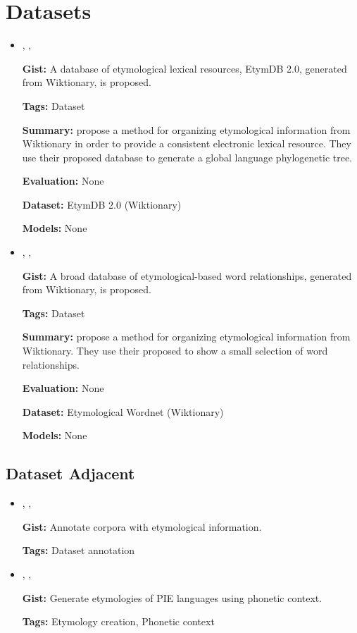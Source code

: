 \documentclass{article}[a4paper]
\newcommand{\bitem}[2]{
    \item[\cite{#1}]
        \citetitle{#1}, \citeauthor{#1}, \citeyear{#1}
        \newline
        {#2}
}%
\begin{document}
\tableofcontents

\section{Datasets}
\begin{itemize}
    \bitem{fourrier_methodological_2020}%
    {%
        \textbf{Gist:}
        A database of etymological lexical resources, EtymDB 2.0, generated from
        Wiktionary, is proposed.

        \textbf{Tags:}
        Dataset

        \textbf{Summary:}
        \citeauthor{fourrier_methodological_2020} propose a method for
        organizing etymological information from Wiktionary in order to provide
        a consistent electronic lexical resource. They use their proposed
        database to generate a global language phylogenetic tree.

        \textbf{Evaluation:}
        None

        \textbf{Dataset:}
        EtymDB 2.0 (Wiktionary)

        \textbf{Models:}
        None
    }%

    \bitem{demelo_etymological_2014}%
    {%
        \textbf{Gist:}
        A broad database of etymological-based word relationships, generated
        from Wiktionary, is proposed.

        \textbf{Tags:}
        Dataset

        \textbf{Summary:}
        \citeauthor{demelo_etymological_2014} propose a method for organizing
        etymological information from Wiktionary. They use their proposed
        to show a small selection of word relationships.

        \textbf{Evaluation:}
        None

        \textbf{Dataset:}
        Etymological Wordnet (Wiktionary)

        \textbf{Models:}
        None
    }%
\end{itemize}

\subsection{Dataset Adjacent}
\begin{itemize}
    \bitem{dash_designing_2013}%
    {%
        \textbf{Gist:}
        Annotate corpora with etymological information.

        \textbf{Tags:}
        Dataset annotation
    }%

    \bitem{pyysalo_proto_2017}%
    {%
        \textbf{Gist:}
        Generate etymologies of PIE languages using phonetic context.

        \textbf{Tags:}
        Etymology creation, Phonetic context
    }%
\end{itemize}
\end{document}
